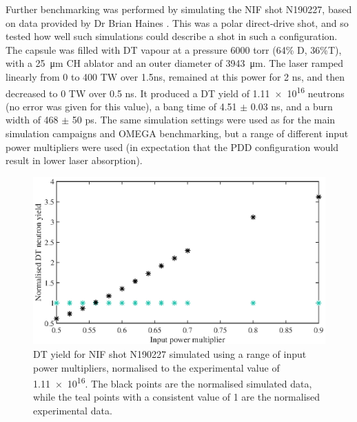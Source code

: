 Further benchmarking was performed by simulating the NIF shot N190227, based on data provided by Dr Brian Haines \cite{NIFshot}. This was a polar direct-drive shot, and so tested how well such simulations could describe a shot in such a configuration. The capsule was filled with DT vapour at a pressure 6000 torr (64\% D, 36\%T), with a 25~\si[per-mode=symbol]{\micro\meter} CH ablator and an  outer diameter of 3943~\si[per-mode=symbol]{\micro\meter}. The laser ramped linearly from 0 to 400 TW over 1.5ns, remained at this power for 2 ns, and then decreased to 0 TW over 0.5 ns. It produced a DT yield of \num{1.11e16} neutrons (no error was given for this value), a bang time of 4.51 $\pm$ 0.03 ns, and a burn width of 468 $\pm$ 50 ps. The same simulation settings were used as for the main simulation campaigns and OMEGA benchmarking, but a range of different input power multipliers were used (in expectation that the PDD configuration would result in lower laser absorption).


\begin{figure}[ht]
\centering
\includegraphics{figures/LowCR/BenchmarkNifYield.eps}
\caption{DT yield for NIF shot N190227 simulated using a range of input power multipliers, normalised to the experimental value of \num{1.11e16}. The black points are the normalised simulated data, while the teal points with a consistent value of 1 are the normalised experimental data.}
\label{fig:NIFYield}
\end{figure}

